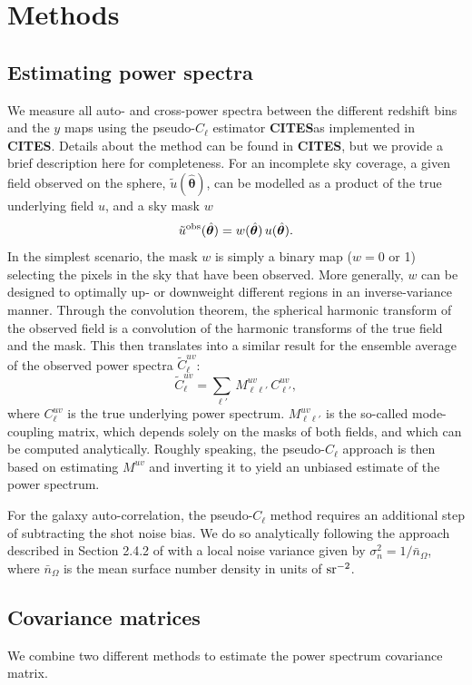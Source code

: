 \documentclass[useAMS,usenatbib]{mn2e}
\newcommand{\nv}{\hat{\boldsymbol{\theta}}}
\newcommand{\cites}{{\bf CITES}}
\begin{document}
\section{Methods}\label{sec:methods}
  \subsection{Estimating power spectra}\label{ssec:methods.cls}
    We measure all auto- and cross-power spectra between the different redshift bins and the $y$ maps using the pseudo-$C_\ell$ estimator \cites as implemented in \cites. Details about the method can be found in \cites, but we provide a brief description here for completeness. For an incomplete sky coverage, a given field observed on the sphere, $\tilde{u}(\nv)$, can be modelled as a product of the true underlying field $u$, and a sky mask $w$
    \begin{equation}
      \tilde{u}^{\rm obs}(\nv) = w(\nv)\,u(\nv).
    \end{equation}
    In the simplest scenario, the mask $w$ is simply a binary map ($w=0$ or 1) selecting the pixels in the sky that have been observed. More generally, $w$ can be designed to optimally up- or downweight different regions in an inverse-variance manner. Through the convolution theorem, the spherical harmonic transform of the observed field is a convolution of the harmonic transforms of the true field and the mask. This then translates into a similar result for the ensemble average of the observed power spectra $\tilde{C}^{uv}_\ell$:
    \begin{equation}
      \tilde{C}^{uv}_\ell = \sum_{\ell'}\,M^{uv}_{\ell \ell'}\, C^{uv}_{\ell'},
    \end{equation}
    where $C^{uv}_\ell$ is the true underlying power spectrum. $M^{uv}_{\ell \ell'}$ is the so-called mode-coupling matrix, which depends solely on the masks of both fields, and which can be computed analytically. Roughly speaking, the pseudo-$C_\ell$ approach is then based on estimating $M^{uv}$ and inverting it to yield an unbiased estimate of the power spectrum.
    
    For the galaxy auto-correlation, the pseudo-$C_\ell$ method requires an additional step of subtracting the shot noise bias. We do so analytically following the approach described in Section 2.4.2 of  with a local noise variance given by $\sigma_n^2=1/\bar{n}_\Omega$, where $\bar{n}_\Omega$ is the mean surface number density in units of ${\rm sr}^{-2}$.

  \subsection{Covariance matrices}\label{ssec:methods.cov}
    We combine two different methods to estimate the power spectrum covariance matrix. 
    
\end{document}
